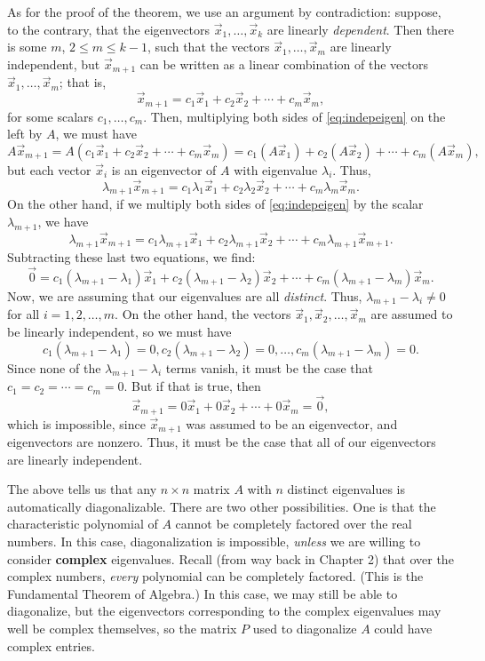 \documentclass[12pt,letterpaper]{article}
\begin{document}
As for the proof of the theorem, we use an argument by contradiction: suppose, to the contrary, that the eigenvectors $\vec{x}_1, \ldots, \vec{x}_k$ are linearly \textit{dependent}. Then there is some $m$, $2\leq m\leq k-1$, such that the vectors $\vec{x}_1, \ldots, \vec{x}_m$ are linearly independent, but $\vec{x}_{m+1}$ can be written as a linear combination of the vectors $\vec{x}_1, \ldots, \vec{x}_m$; that is,
\begin{equation}\label{eq:indepeigen}
 \vec{x}_{m+1} = c_1\vec{x}_1+c_2\vec{x}_2+\cdots + c_m\vec{x}_m,
\end{equation}
for some scalars $c_1,\ldots, c_m$. Then, multiplying both sides of \eqref{eq:indepeigen} on the left by $A$, we must have
\[
 A\vec{x}_{m+1} = A(c_1\vec{x}_1+c_2\vec{x}_2+\cdots + c_m\vec{x}_m) = c_1(A\vec{x}_1)+c_2(A\vec{x}_2)+\cdots + c_m(A\vec{x}_m),
\]
but each vector $\vec{x}_i$ is an eigenvector of $A$ with eigenvalue $\lambda_i$. Thus,
\[
 \lambda_{m+1}\vec{x}_{m+1} = c_1\lambda_1\vec{x}_1+c_2\lambda_2\vec{x}_2+\cdots + c_m\lambda_m\vec{x}_m.
\]
On the other hand, if we multiply both sides of \eqref{eq:indepeigen} by the scalar $\lambda_{m+1}$, we have
\[
 \lambda_{m+1}\vec{x}_{m+1} = c_1\lambda_{m+1}\vec{x}_1 + c_2\lambda_{m+1}\vec{x}_2 + \cdots + c_m\lambda_{m+1}\vec{x}_{m+1}.
\]
Subtracting these last two equations, we find:
\[
 \vec{0} = c_1(\lambda_{m+1}-\lambda_1)\vec{x}_1 + c_2(\lambda_{m+1}-\lambda_2)\vec{x}_2+\cdots + c_m(\lambda_{m+1}-\lambda_m)\vec{x}_m.
\]
Now, we are assuming that our eigenvalues are all \textit{distinct}. Thus, $\lambda_{m+1}-\lambda_i\neq 0$ for all $i=1,2,\ldots, m$. On the other hand, the vectors $\vec{x}_1,\vec{x}_2, \ldots, \vec{x}_m$ are assumed to be linearly independent, so we must have
\[
 c_1(\lambda_{m+1}-\lambda_1) = 0, c_2(\lambda_{m+1}-\lambda_2)=0, \ldots, c_m(\lambda_{m+1}-\lambda_m)=0.
\]
Since none of the $\lambda_{m+1}-\lambda_i$ terms vanish, it must be the case that $c_1=c_2=\cdots =c_m=0$. But if that is true, then
\[
 \vec{x}_{m+1} = 0\vec{x}_1+0\vec{x}_2+\cdots + 0\vec{x}_m = \vec{0},
\]
which is impossible, since $\vec{x}_{m+1}$ was assumed to be an eigenvector, and eigenvectors are nonzero. Thus, it must be the case that all of our eigenvectors are linearly independent.

\medskip

The above tells us that any $n\times n$ matrix $A$ with $n$ distinct eigenvalues is automatically diagonalizable. There are two other possibilities. One is that the characteristic polynomial of $A$ cannot be completely factored over the real numbers. In this case, diagonalization is impossible, \textit{unless} we are willing to consider \textbf{complex} eigenvalues. Recall (from way back in Chapter 2) that over the complex numbers, \textit{every} polynomial can be completely factored. (This is the Fundamental Theorem of Algebra.) In this case, we may still be able to diagonalize, but the eigenvectors corresponding to the complex eigenvalues may well be complex themselves, so the matrix $P$ used to diagonalize $A$ could have complex entries.
\end{document}
